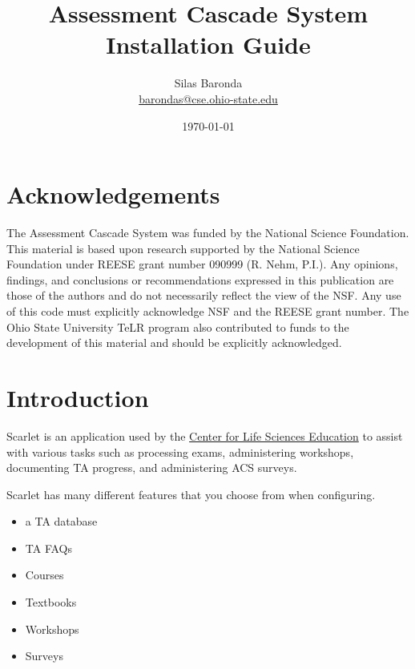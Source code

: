 \documentclass[pdftex,11pt,letterpaper]{article}
\begin{document}
\title{Assessment Cascade System Installation Guide}
\author{Silas Baronda\\\href{mailto:barondas@cse.ohio-state.edu}{barondas@cse.ohio-state.edu}}

\date{\today}
\maketitle

\tableofcontents
\newpage

\listoffigures
\newpage

\section{Acknowledgements}

The Assessment Cascade System was funded by the National Science Foundation.  
This material is based upon research supported by the National Science 
Foundation under REESE grant number 090999 (R. Nehm, P.I.). Any opinions, 
findings, and conclusions or recommendations expressed in this publication are 
those of the authors and do not necessarily reflect the view of the NSF. Any 
use of this code must explicitly acknowledge NSF and the REESE grant number.  
The Ohio State University TeLR program also contributed to funds to the 
development of this material and should be explicitly acknowledged. 

\newpage

\section{Introduction}

Scarlet is an application used by the \href{http://biology.osu.edu/}{Center for Life Sciences Education} to assist with various tasks such as processing exams, administering workshops, documenting TA progress, and administering ACS surveys.

Scarlet has many different features that you choose from when configuring.

\begin{itemize}
\item a TA database
\item TA FAQs
\item Courses
\item Textbooks
\item Workshops
\item Surveys
\end{itemize}
\end{document}
